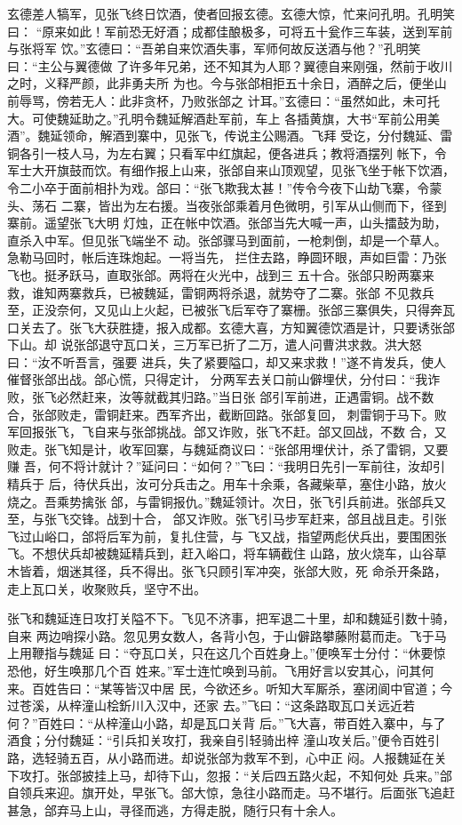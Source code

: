 玄德差人犒军，见张飞终日饮酒，使者回报玄德。玄德大惊，忙来问孔明。孔明笑曰：
“原来如此！军前恐无好酒；成都佳酿极多，可将五十瓮作三车装，送到军前与张将军
饮。”玄德曰：“吾弟自来饮酒失事，军师何故反送酒与他？”孔明笑曰：“主公与翼德做
了许多年兄弟，还不知其为人耶？翼德自来刚强，然前于收川之时，义释严颜，此非勇夫所
为也。今与张郃相拒五十余日，酒醉之后，便坐山前辱骂，傍若无人：此非贪杯，乃败张郃之
计耳。”玄德曰：“虽然如此，未可托大。可使魏延助之。”孔明令魏延解酒赴军前，车上
各插黄旗，大书“军前公用美酒”。魏延领命，解酒到寨中，见张飞，传说主公赐酒。飞拜
受讫，分付魏延、雷铜各引一枝人马，为左右翼；只看军中红旗起，便各进兵；教将酒摆列
帐下，令军士大开旗鼓而饮。有细作报上山来，张郃自来山顶观望，见张飞坐于帐下饮酒，
令二小卒于面前相扑为戏。郃曰：“张飞欺我太甚！”传令今夜下山劫飞寨，令蒙头、荡石
二寨，皆出为左右援。当夜张郃乘着月色微明，引军从山侧而下，径到寨前。遥望张飞大明
灯烛，正在帐中饮酒。张郃当先大喊一声，山头擂鼓为助，直杀入中军。但见张飞端坐不
动。张郃骤马到面前，一枪刺倒，却是一个草人。急勒马回时，帐后连珠炮起。一将当先，
拦住去路，睁圆环眼，声如巨雷：乃张飞也。挺矛跃马，直取张郃。两将在火光中，战到三
五十合。张郃只盼两寨来救，谁知两寨救兵，已被魏延，雷铜两将杀退，就势夺了二寨。张郃
不见救兵至，正没奈何，又见山上火起，已被张飞后军夺了寨栅。张郃三寨俱失，只得奔瓦
口关去了。张飞大获胜捷，报入成都。玄德大喜，方知翼德饮酒是计，只要诱张郃下山。却
说张郃退守瓦口关，三万军已折了二万，遣人问曹洪求救。洪大怒曰：“汝不听吾言，强要
进兵，失了紧要隘口，却又来求救！”遂不肯发兵，使人催督张郃出战。郃心慌，只得定计，
分两军去关口前山僻埋伏，分付曰：“我诈败，张飞必然赶来，汝等就截其归路。”当日张
郃引军前进，正遇雷铜。战不数合，张郃败走，雷铜赶来。西军齐出，截断回路。张郃复回，
刺雷铜于马下。败军回报张飞，飞自来与张郃挑战。郃又诈败，张飞不赶。郃又回战，不数
合，又败走。张飞知是计，收军回寨，与魏延商议曰：“张郃用埋伏计，杀了雷铜，又要赚
吾，何不将计就计？”延问曰：“如何？”飞曰：“我明日先引一军前往，汝却引精兵于
后，待伏兵出，汝可分兵击之。用车十余乘，各藏柴草，塞住小路，放火烧之。吾乘势擒张
郃，与雷铜报仇。”魏延领计。次日，张飞引兵前进。张郃兵又至，与张飞交锋。战到十合，
郃又诈败。张飞引马步军赶来，郃且战且走。引张飞过山峪口，郃将后军为前，复扎住营，与
飞又战，指望两彪伏兵出，要围困张飞。不想伏兵却被魏延精兵到，赶入峪口，将车辆截住
山路，放火烧车，山谷草木皆着，烟迷其径，兵不得出。张飞只顾引军冲突，张郃大败，死
命杀开条路，走上瓦口关，收聚败兵，坚守不出。

张飞和魏延连日攻打关隘不下。飞见不济事，把军退二十里，却和魏延引数十骑，自来
两边哨探小路。忽见男女数人，各背小包，于山僻路攀藤附葛而走。飞于马上用鞭指与魏延
曰：“夺瓦口关，只在这几个百姓身上。”便唤军士分付：“休要惊恐他，好生唤那几个百
姓来。”军士连忙唤到马前。飞用好言以安其心，问其何来。百姓告曰：“某等皆汉中居
民，今欲还乡。听知大军厮杀，塞闭阆中官道；今过苍溪，从梓潼山桧釿川入汉中，还家
去。”飞曰：“这条路取瓦口关远近若何？”百姓曰：“从梓潼山小路，却是瓦口关背
后。”飞大喜，带百姓入寨中，与了酒食；分付魏延：“引兵扣关攻打，我亲自引轻骑出梓
潼山攻关后。”便令百姓引路，选轻骑五百，从小路而进。却说张郃为救军不到，心中正
闷。人报魏延在关下攻打。张郃披挂上马，却待下山，忽报：“关后四五路火起，不知何处
兵来。”郃自领兵来迎。旗开处，早张飞。郃大惊，急往小路而走。马不堪行。后面张飞追赶
甚急，郃弃马上山，寻径而逃，方得走脱，随行只有十余人。

